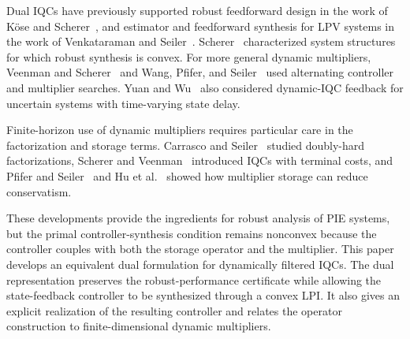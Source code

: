 Dual IQCs have previously supported robust feedforward design in the work of
K\"ose and Scherer~\cite{kose2009robust}, and estimator and feedforward
synthesis for LPV systems in the work of Venkataraman and
Seiler~\cite{venkataraman}. Scherer~\cite{scherer2009robust} characterized
system structures for which robust synthesis is convex. For more general
dynamic multipliers, Veenman and Scherer~\cite{veenman2014iqcsynthesis} and
Wang, Pfifer, and Seiler~\cite{wang2016robustiqc} used alternating controller
and multiplier searches. Yuan and Wu~\cite{7353149} also considered
dynamic-IQC feedback for uncertain systems with time-varying state delay.

Finite-horizon use of dynamic multipliers requires particular care in the
factorization and storage terms. Carrasco and
Seiler~\cite{carrasco2018equivalence} studied doubly-hard factorizations,
Scherer and Veenman~\cite{scherer2018dynamicdissipation} introduced IQCs with
terminal costs, and Pfifer and Seiler~\cite{magicalhiddenenergy} and Hu et
al.~\cite{hu} showed how multiplier storage can reduce conservatism.

These developments provide the ingredients for robust analysis of PIE systems,
but the primal controller-synthesis condition remains nonconvex because the
controller couples with both the storage operator and the multiplier. This
paper develops an equivalent dual formulation for dynamically filtered IQCs.
The dual representation preserves the robust-performance certificate while
allowing the state-feedback controller to be synthesized through a convex LPI.
It also gives an explicit realization of the resulting controller and relates
the operator construction to finite-dimensional dynamic multipliers.

